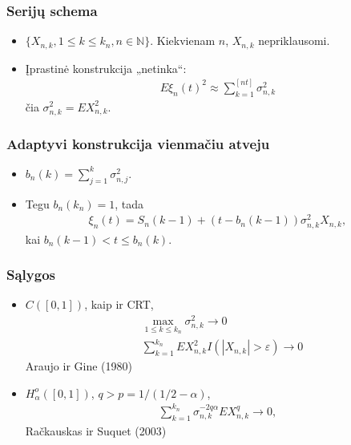 \documentclass[utf8,hyperref={unicode}]{beamer}
\newcommand{\eps}{\varepsilon}
\theoremstyle{change}\newtheorem{teorema}{Teiginys}
\theoremstyle{change}\newtheorem{salyga}{}
\begin{document}
\begin{frame}
    \frametitle{Serijų schema} 
    \begin{itemize}
	\item $\{X_{n,k},1\le k\le k_n, n\in \mathbb{N}\}$. Kiekvienam
	    $n$, $X_{n,k}$ nepriklausomi.
	\item Įprastinė konstrukcija „netinka“:
	    \begin{align*}
		E\xi_n(t)^2\approx\sum_{k=1}^{[nt]}\sigma^2_{n,k}
	    \end{align*}
	    čia $\sigma_{n,k}^2=EX_{n,k}^2$.
    \end{itemize}
\end{frame}
\begin{frame}
    \frametitle{Adaptyvi konstrukcija vienmačiu atveju} 
    \begin{itemize}
	\item $b_n(k)=\sum_{j=1}^{k}\sigma^2_{n,j}$. 
	\item Tegu $b_n(k_n)=1$, tada
	    \begin{align*}
		\xi_n(t)=S_n(k-1)+(t-b_n(k-1))\sigma^2_{n,k}X_{n,k},
	    \end{align*}
	kai  $b_n(k-1)< t\le b_n(k)$.

    \end{itemize}
\end{frame}
\begin{frame}
    \frametitle{Sąlygos} 
    \begin{itemize}
	\item $C([0,1])$, kaip ir CRT, 
	    \begin{align*}
		&\max_{1\le k\le k_n} \sigma^2_{n,k}\to 0\\
		&\sum_{k=1}^{k_n} EX_{n,k}^2I(|X_{n,k}|>\eps)\to 0
	    \end{align*}
	    Araujo ir Gine (1980)
	\item $H_{\alpha}^o([0,1])$, $q>p=1/(1/2-\alpha)$, 
	    \begin{align*}
		\sum_{k=1}^{k_n}\sigma_{n,k}^{-2q\alpha} EX_{n,k}^q\to 0,
	    \end{align*}
	    Račkauskas ir Suquet (2003)
    \end{itemize}
\end{frame}
\end{document}
